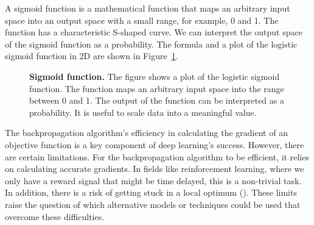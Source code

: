 A sigmoid function is a mathematical function that maps an arbitrary input space into an output space with a small range, for example, 0 and 1. The function has a characteristic S-shaped curve. We can interpret the output space of the sigmoid function as a probability. The formula and a plot of the logistic sigmoid function in 2D are shown in Figure~\ref{fig:sigmoid}.
\begin{figure}[ht]
\centering
{}
\caption[Sigmoid function]{
  \textbf{Sigmoid function.}
  The figure shows a plot of the logistic sigmoid function. The function maps an arbitrary input space into the range between 0 and 1. The output of the function can be interpreted as a probability. It is useful to scale data into a meaningful value.
}
\label{fig:sigmoid}
\end{figure}

The backpropagation algorithm's efficiency in calculating the gradient of an objective function is a key component of deep learning's success. However, there are certain limitations. For the backpropagation algorithm to be efficient, it relies on calculating accurate gradients. In fields like reinforcement learning, where we only have a reward signal that might be time delayed, this is a non-trivial task. In addition, there is a risk of getting stuck in a local optimum (\cite{ha2017visual}). These limits raise the question of which alternative models or techniques could be used that overcome these difficulties.





